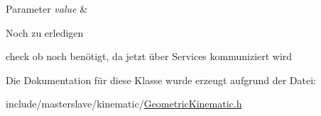\begin{DoxyParams}{Parameter}
{\em value} & \\
\hline
\end{DoxyParams}
\begin{DoxyRefDesc}{Noch zu erledigen}
\item[\hyperlink{todo__todo000010}{Noch zu erledigen}]check ob noch benötigt, da jetzt über Services kommuniziert wird \end{DoxyRefDesc}


Die Dokumentation für diese Klasse wurde erzeugt aufgrund der Datei\-:\begin{DoxyCompactItemize}
\item 
include/masterslave/kinematic/\hyperlink{GeometricKinematic_8h}{Geometric\-Kinematic.\-h}\end{DoxyCompactItemize}
